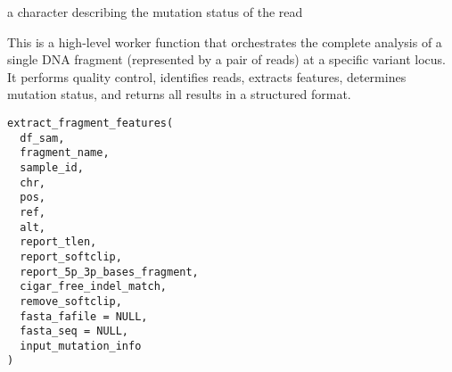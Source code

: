 \documentclass[a4paper]{book}
\begin{document}
%
\begin{Value}
a character describing the mutation status of the read
\end{Value}
%
\begin{Description}
This is a high-level worker function that orchestrates the complete analysis of a single DNA fragment
(represented by a pair of reads) at a specific variant locus. It performs quality control, identifies reads, extracts
features, determines mutation status, and returns all results in a structured format.
\end{Description}
%
\begin{Usage}
\begin{verbatim}
extract_fragment_features(
  df_sam,
  fragment_name,
  sample_id,
  chr,
  pos,
  ref,
  alt,
  report_tlen,
  report_softclip,
  report_5p_3p_bases_fragment,
  cigar_free_indel_match,
  remove_softclip,
  fasta_fafile = NULL,
  fasta_seq = NULL,
  input_mutation_info
)
\end{verbatim}
\end{Usage}
%
\end{document}
